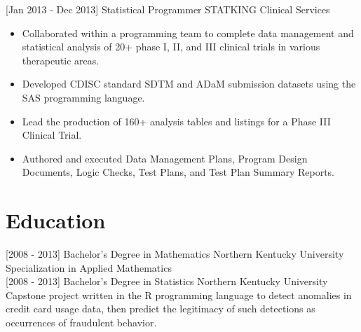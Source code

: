 \documentclass[]{moak-resume}
\begin{document}
\begin{entrylist}
    \entry
    {[Jan 2013 - Dec 2013]}
    {Statistical Programmer}
    {STATKING Clinical Services}
    {}
  \end{entrylist}
\begin{itemize}
  \setlength\itemsep{-0.4em}
  \item \small\bodyfont Collaborated within a programming team to complete data management and statistical analysis of 20+ phase I, II, and III clinical trials in various therapeutic areas.
  \item \small\bodyfont Developed CDISC standard SDTM and ADaM submission datasets using the SAS programming language.
  \item \small\bodyfont Lead the production of 160+ analysis tables and listings for a Phase III Clinical Trial.
  \item \small\bodyfont Authored and executed Data Management Plans, Program Design Documents, Logic Checks, Test Plans, and Test Plan Summary Reports.
  \newline
\end{itemize}  



\section{Education}
\begin{entrylist}
  \entry
    {[2008 - 2013]}
    {Bachelor's Degree in Mathematics}
    {Northern Kentucky University}
    {Specialization in Applied Mathematics\\}
  \entry
    {[2008 - 2013]}
    {Bachelor's Degree in Statistics}
    {Northern Kentucky University}
    {Capstone project written in the R programming language to detect anomalies in credit card usage data, then predict the legitimacy of such detections as occurrences of fraudulent behavior.\\}
\end{entrylist}
\end{document}
